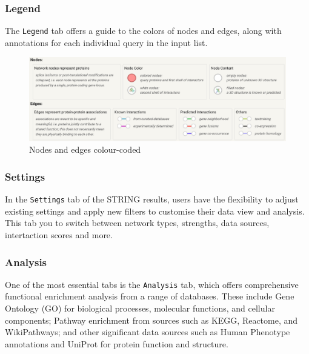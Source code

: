 \documentclass[
]{book}
\begin{document}
\hypertarget{legend}{%
\subsubsection{Legend}\label{legend}}

The \texttt{Legend} tab offers a guide to the colors of nodes and edges, along with annotations for each individual query in the input list.

\begin{figure}

{\centering \includegraphics[width=1\linewidth]{images/string-legend} 

}

\caption{Nodes and edges colour-coded}\label{fig:unnamed-chunk-19}
\end{figure}

\hypertarget{settings}{%
\subsubsection{Settings}\label{settings}}

In the \texttt{Settings} tab of the STRING results, users have the flexibility to adjust existing settings and apply new filters to customise their data view and analysis. This tab you to switch between network types, strengths, data sources, intertaction scores and more.

\hypertarget{analysis}{%
\subsubsection{Analysis}\label{analysis}}

One of the most essential tabs is the \texttt{Analysis} tab, which offers comprehensive functional enrichment analysis from a range of databases. These include Gene Ontology (GO) for biological processes, molecular functions, and cellular components; Pathway enrichment from sources such as KEGG, Reactome, and WikiPathways; and other significant data sources such as Human Phenotype annotations and UniProt for protein function and structure.
\end{document}
